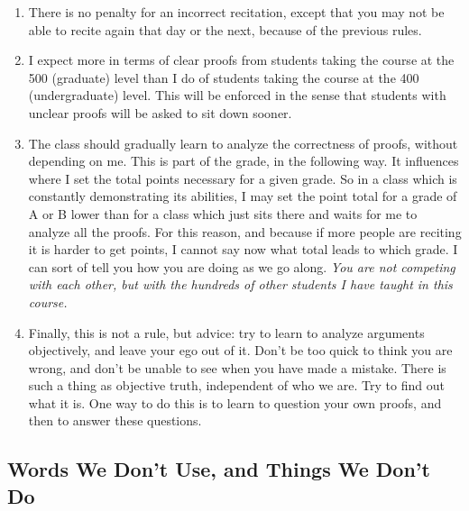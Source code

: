 \documentclass{article}
\begin{document}
\begin{enumerate}[1.]
  \item There is no penalty for an incorrect recitation, except that you may not be able to recite again that day or the next, because of the previous rules.

  \item I expect more in terms of clear proofs from students taking the course at the 500 (graduate) level than I do of students taking the course at the 400 (undergraduate) level. This will be enforced in the sense that students with unclear proofs will be asked to sit down sooner.

  \item The class should gradually learn to analyze the correctness of proofs, without depending on me. This is part of the grade, in the following way. It influences where I set the total points necessary for a given grade. So in a class which is constantly demonstrating its abilities, I may set the point total for a grade of A or B lower than for a class which just sits there and waits for me to analyze all the proofs. For this reason, and because if more people are reciting it is harder to get points, I cannot say now what total leads to which grade. I can sort of tell you how you are doing as we go along. \emph{You are not competing with each other, but with the hundreds of other students I have taught in this course.}

  \item Finally, this is not a rule, but advice: try to learn to analyze arguments objectively, and leave your ego out of it. Don't be too quick to think you are wrong, and don't be unable to see when you have made a mistake. There is such a thing as objective truth, independent of who we are. Try to find out what it is. One way to do this is to learn to question your own proofs, and then to answer these questions.

\end{enumerate}


\subsection{Words We Don't Use, and Things We Don't Do}
\end{document}
